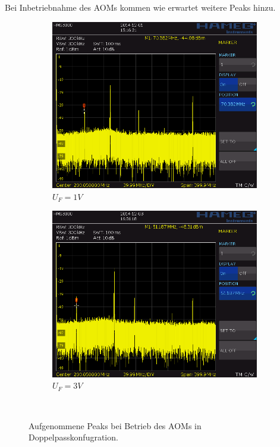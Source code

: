 \documentclass[bigchapter,colorback,accentcolor=tud4b,linedtoc,11pt]{tudreport}
\begin{document}
Bei Inbetriebnahme des AOMs kommen wie erwartet weitere Peaks hinzu.

\begin{figure}[H]
  \centering
  \begin{subfigure}[H]{0.45\textwidth}
    \includegraphics[width=\textwidth]{data/Aufgabe6/frequ_Uf_1.png}
    \caption[Cap for listoffigures]{$U_F = 1V$}
    \label{fig:UF1}
  \end{subfigure}
  \begin{subfigure}[H]{0.45\textwidth}
    \includegraphics[width=\textwidth]{data/Aufgabe6/Aufgabe6_Uf3V_AOMein.png}
    \caption[Cap for listoffigures]{$U_F = 3V$}
    \label{fig:UF3}
  \end{subfigure}~%
  \caption{Aufgenommene Peaks bei Betrieb des AOMs in Doppelpasskonfugration.\cite{AndereGruppe}}\label{fig:doublepasspeaks}
\end{figure}
\end{document}
